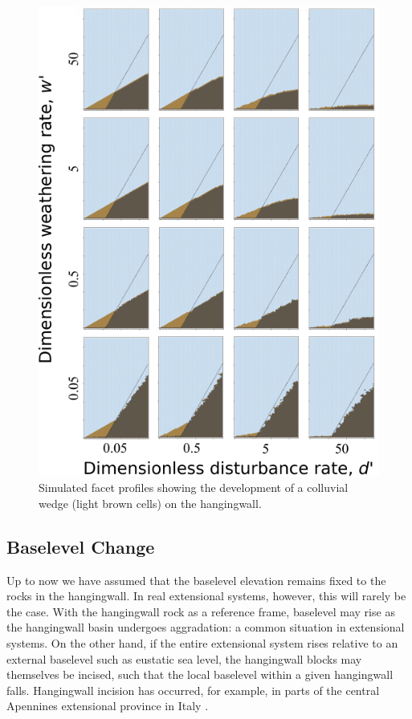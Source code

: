 \begin{figure}[ht!]
\centerline{\includegraphics[scale=1.5]{figure12.pdf}}
\caption{Simulated facet profiles showing the development of a colluvial wedge (light brown cells) on the hangingwall.}
\label{fig:colluv}
\end{figure}


\subsection{Baselevel Change}

Up to now we have assumed that the baselevel elevation remains fixed to the rocks in the hangingwall. In real extensional systems, however, this will rarely be the case. With the hangingwall rock as a reference frame, baselevel may rise as the hangingwall basin undergoes aggradation: a common situation in extensional systems. On the other hand, if the entire extensional system rises relative to an external baselevel such as eustatic sea level, the hangingwall blocks may themselves be incised, such that the local baselevel within a given hangingwall falls. Hangingwall incision has occurred, for example, in parts of the central Apennines extensional province in Italy \citep[e.g.,][]{dagostino2003interactions}.

